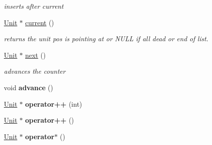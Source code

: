 \begin{DoxyCompactItemize}
\begin{DoxyCompactList}\small\item\em inserts after current \end{DoxyCompactList}\item 
\hyperlink{classUnit}{Unit} $\ast$ \hyperlink{classUnitCollection_1_1UnitIterator_af6ee5f304588c259fac4fc1584428809}{current} ()\hypertarget{classUnitCollection_1_1UnitIterator_af6ee5f304588c259fac4fc1584428809}{}\label{classUnitCollection_1_1UnitIterator_af6ee5f304588c259fac4fc1584428809}

\begin{DoxyCompactList}\small\item\em returns the unit pos is pointing at or N\+U\+LL if all dead or end of list. \end{DoxyCompactList}\item 
\hyperlink{classUnit}{Unit} $\ast$ \hyperlink{classUnitCollection_1_1UnitIterator_a503d31186743c62e783322305fda85ca}{next} ()\hypertarget{classUnitCollection_1_1UnitIterator_a503d31186743c62e783322305fda85ca}{}\label{classUnitCollection_1_1UnitIterator_a503d31186743c62e783322305fda85ca}

\begin{DoxyCompactList}\small\item\em advances the counter \end{DoxyCompactList}\item 
void {\bfseries advance} ()\hypertarget{classUnitCollection_1_1UnitIterator_a7820328627fac7b3e6c5353afc785afa}{}\label{classUnitCollection_1_1UnitIterator_a7820328627fac7b3e6c5353afc785afa}

\item 
\hyperlink{classUnit}{Unit} $\ast$ {\bfseries operator++} (int)\hypertarget{classUnitCollection_1_1UnitIterator_a396efd27a17b6cab8f3f76f16b4b3807}{}\label{classUnitCollection_1_1UnitIterator_a396efd27a17b6cab8f3f76f16b4b3807}

\item 
\hyperlink{classUnit}{Unit} $\ast$ {\bfseries operator++} ()\hypertarget{classUnitCollection_1_1UnitIterator_a5515296e8add28708c152aa10ee095f4}{}\label{classUnitCollection_1_1UnitIterator_a5515296e8add28708c152aa10ee095f4}

\item 
\hyperlink{classUnit}{Unit} $\ast$ {\bfseries operator$\ast$} ()\hypertarget{classUnitCollection_1_1UnitIterator_a99bfd0030eb9bff2b03d549211904203}{}\label{classUnitCollection_1_1UnitIterator_a99bfd0030eb9bff2b03d549211904203}

\end{DoxyCompactItemize}
